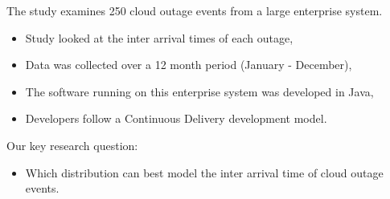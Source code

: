\documentclass[portrait,a0b,final]{a0poster}
\newenvironment{poster}{
  \begin{center}
  \begin{minipage}[c]{0.98\textwidth}
}{
  \end{minipage} 
  \end{center}
}
\newenvironment{pcolumn}[1]{
  \begin{minipage}{#1\textwidth}
  \begin{center}
}{
  \end{center}
  \end{minipage}
}
\newcommand{\pbox}[4]{
\psshadowbox[#3]{
\begin{minipage}[t][#2][t]{#1}
#4
\end{minipage}
}}
\begin{document}
\begin{poster}
\begin{center}
\begin{pcolumn}{0.49}
{\medskip
\begin{center}\pbox{0.8\textwidth}{}{linewidth=2mm,framearc=0.1,linecolor=lightblue,fillstyle=gradient,gradangle=0,gradbegin=white,gradend=whiteblue,gradmidpoint=1.0,framesep=1em}{\begin{center}Dataset\end{center}}\end{center}\vspace{1.25cm}

\smallskip

The study examines 250 cloud outage events from a large enterprise system.

\medskip 
\medskip 

\begin{itemize}
\item Study looked at the inter arrival times of each outage,
\item Data was collected over a 12 month period (January - December),
\item The software running on this enterprise system was developed in Java,
\item Developers follow a Continuous Delivery development model.
\end{itemize}

\medskip 
\medskip 

Our key research question:

\medskip 
\medskip 

\begin{itemize}
\item Which distribution can best model the inter arrival time of cloud outage events.
\end{itemize}


\smallskip


}
\end{pcolumn}
\end{center}

\vspace*{2cm}

\begin{center}
\begin{pcolumn}{0.49}
\pbox{0.9\textwidth}{28cm}{linewidth=2mm,framearc=0.1,linecolor=lightblue,fillstyle=gradient,gradangle=0,gradbegin=white,gradend=white,gradmidpoint=1.0,framesep=1em}{

}
\end{pcolumn}
\end{center}
\end{poster}
\end{document}
